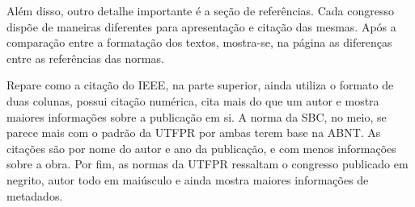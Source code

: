 

Além disso, outro detalhe importante é a seção de referências. Cada congresso dispõe de maneiras diferentes para apresentação e citação das mesmas. Após a comparação entre a formatação dos textos, mostra-se, na página \pageref{referencias} as diferenças entre as referências das normas.

Repare como a citação do IEEE, na parte superior, ainda utiliza o formato de duas colunas, possui citação numérica, cita mais do que um autor e mostra maiores informações sobre a publicação em si. A norma da SBC, no meio, se parece mais com o padrão da UTFPR por ambas terem base na ABNT. As citações são por nome do autor e ano da publicação, e com menos informações sobre a obra. Por fim, as normas da UTFPR ressaltam o congresso publicado em negrito, autor todo em maiúsculo e ainda mostra maiores informações de metadados.

